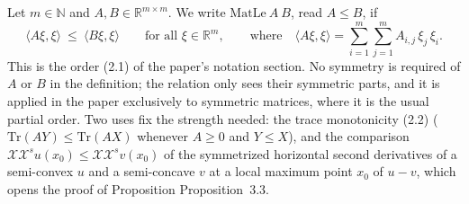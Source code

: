 \begin{definition}
Let $m\in\mathbb N$ and $A,B\in\mathbb R^{m\times m}$. We write
$\mathrm{MatLe}\ A\ B$, read $A\le B$, if
\[
 \langle A\xi,\xi\rangle\ \le\ \langle B\xi,\xi\rangle\qquad\text{for all }\xi\in\mathbb R^m,
 \qquad\text{where}\quad
 \langle A\xi,\xi\rangle=\sum_{i=1}^m\sum_{j=1}^m A_{i,j}\,\xi_j\,\xi_i .
\]
This is the order (2.1) of the paper's notation section. No symmetry is required of
$A$ or $B$ in the definition; the relation only sees their symmetric parts, and it is
applied in the paper exclusively to symmetric matrices, where it is the usual partial
order. Two uses fix the strength needed: the trace monotonicity (2.2)
($\mathrm{Tr}(AY)\le\mathrm{Tr}(AX)$ whenever $A\ge0$ and $Y\le X$), and the comparison
$\mathcal X\mathcal X^{s}u(x_0)\le\mathcal X\mathcal X^{s}v(x_0)$ of the symmetrized
horizontal second derivatives of a semi-convex $u$ and a semi-concave $v$ at a local
maximum point $x_0$ of $u-v$, which opens the proof of Proposition Proposition~3.3.
\end{definition}
